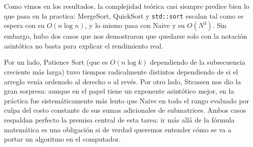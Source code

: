     Como vimos en los resultados, la complejidad teórica casi siempre predice bien lo que pasa en la practica: MergeSort, QuickSort y \texttt{std::sort} escalan tal como se espera con su $O(n \log n)$, y lo mismo pasa con Naive y su $O(N^3)$. Sin embargo, hubo dos casos que nos demostraron que quedarse solo con la notación asintótica no basta para explicar el rendimiento real.

    Por un lado, Patience Sort (que es $O(n \log k)$ dependiendo de la subsecuencia creciente más larga) tuvo tiempos radicalmente distintos dependiendo de si el arreglo venía ordenado al derecho o al revés. Por otro lado, Strassen nos dio la gran sorpresa: aunque en el papel tiene un exponente asintótico mejor, en la práctica fue sistemáticamente más lento que Naive en todo el rango evaluado por culpa del costo constante de sus sumas adicionales de submatrices. Ambos casos respaldan perfecto la premisa central de esta tarea: ir más allá de la fórmula matemática es una obligación si de verdad queremos entender cómo se va a portar un algoritmo en el computador.